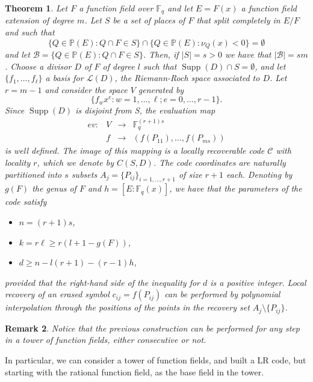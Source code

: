 \documentclass{amsart}
\newcommand{\m}{\mathcal}
\newcommand{\F}{\mathbb{F}}
\renewcommand{\P}{\mathbb{P}}
\newcommand{\supp}{\operatorname{Supp}}
\newtheorem{thm}{Theorem}[section]
\newtheorem{rem}[thm]{Remark}
\theoremstyle{definition}
\begin{document}
\begin{thm}\label{teobargtamo} Let $F$ a function field over $\F_q$  and let $E=F(x)$ a function field extension of degree $m$. Let $S$ be a set of places of $F$ that split completely in $E/F$ and such that  
$$\{Q \in \P(E): Q\cap F \in S\}
\cap\{Q\in \P(E): \nu_Q(x)<0\}=\emptyset$$ and let $\m{B}=\{Q\in \P(E): Q\cap F\in S \}$. Then, if $|S|=s>0$ we have that $|\m{B}|= sm$. Choose a divisor $D$ of $F$ of degree $l$ such that $\supp(D)\cap S=\emptyset$, and let $\{f_1, \ldots, f_\ell\}$ a basis for $\m{L}(D)$, the Riemann-Roch space associated to $D$. Let $r=m-1$ and consider the space $V$ generated by 
$$\{f_wx^{e}:w=1, \ldots, \ell; e=0,\ldots, r-1\}.$$ Since $\supp(D)$ is disjoint from S, the evaluation map 
$$
\begin{array}{cccl}
 ev: & V  &  \longrightarrow& \F_q^{(r+1)s} \\
 & f& \rightarrow  &  (f(P_{11}), \ldots, f(P_{ms}) )
\end{array}
$$ is well defined. The image of this mapping is a locally recoverable code $\m{C}$ with locality $r$, which we denote by
$C(S,D)$. The code coordinates are naturally partitioned into $s$ subsets $A_j = \{P_{ij}\}_{i = 1,...,r+1}$ of size $r+1$ each. Denoting by $g(F)$ the genus of $F$ and $h=[E:\F_q(x)]$, we have that the parameters of the code satisfy

\begin{itemize}
\item $n= (r+1)s$,
 \item $k= r\ell\geq r(l+1-g(F))$,
 \item $d\geq n-l(r+1)-(r-1)h$,
\end{itemize}
 provided that the right-hand side of the inequality for $d$ is a positive integer. Local recovery of an erased symbol $c_{ij} = f (P_{ij})$ can be performed by polynomial interpolation through the positions of the points in the recovery set $A_j\setminus\{P_{ij}\}$.\end{thm}


\begin{rem}
Notice that the previous construction can be performed for any step in a tower of function fields, either consecutive or not. 
\end{rem}

In particular, we can consider a tower of function fields, and built a LR code, but starting with the rational function field, as the base field in the tower. 
\end{document}
